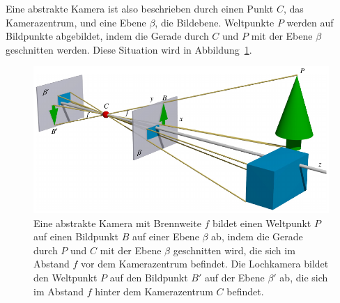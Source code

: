 Eine abstrakte Kamera ist also beschrieben durch einen Punkt $C$,
das Kamerazentrum, und eine Ebene $\beta$, die Bildebene.
Weltpunkte $P$ werden auf Bildpunkte abgebildet, indem die Gerade
durch $C$ und $P$ mit der Ebene $\beta$ geschnitten werden.
Diese Situation wird in Abbildung~\ref{applications:kamera:abstrakt}.
\begin{figure}
\centering
\includegraphics{applications/kamera/abstrakt.pdf}
\caption{Eine abstrakte Kamera mit Brennweite $f$ bildet einen Weltpunkt
$P$ auf einen Bildpunkt $B$ auf einer Ebene $\beta$ ab,
indem die
Gerade durch $P$ und $C$ mit der Ebene $\beta$ geschnitten wird,
die sich im Abstand $f$ vor dem Kamerazentrum befindet.
Die Lochkamera bildet den Weltpunkt $P$ auf den Bildpunkt $B'$ auf der
Ebene $\beta'$ ab, die sich im Abstand $f$ hinter dem Kamerazentrum $C$
befindet.
\label{applications:kamera:abstrakt}}
\end{figure}

